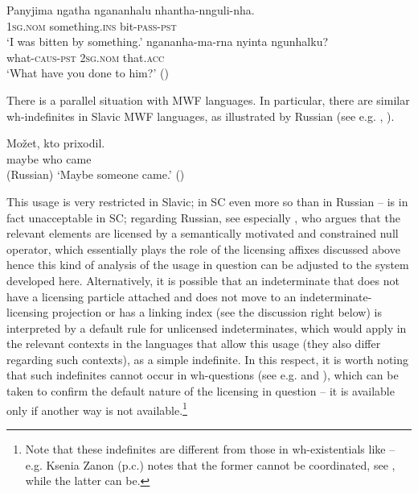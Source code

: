 \documentclass[output=paper,colorlinks,citecolor=brown]{langscibook}
\begin{document}
\ea Panyjima\label{ex:bosk:19}
\ea \label{ex:bosk:19a}
\gll ngatha       ngananhalu            nhantha-nnguli-nha.\\
\textsc{1sg.nom} something.\textsc{ins} bit-\textsc{pass}-\textsc{pst}\\%
\glt `I was bitten by something.'
\ex \label{ex:bosk:19b}
\gll ngananha-ma-rna   nyinta         ngunhalku?\\  what-\textsc{caus}-\textsc{pst}  \textsc{2sg.nom}  that.\textsc{acc}\\
\glt  `What have you done to him?'          \hfill (\citealt{Dench1981})
\z 
\z 

\noindent There is a parallel situation with MWF languages. In particular, there are similar wh-indefinites in Slavic MWF languages, as illustrated by Russian  (see e.g. \citealt{Zanon2022}, \citealt{HengeveldRoelofsen2023}).

 
\ea \label{ex:bosk:20}
\gll Možet, kto   prixodil.\\
maybe who  came  \\\hfill (Russian)
\glt        `Maybe someone came.' \hfill (\citealt{HengeveldRoelofsen2023})                  \z 

\noindent This usage is very restricted in Slavic; in SC even more so than in Russian --  is in fact unacceptable in SC; regarding Russian, see especially \citet{Zanon2022}, who argues that the relevant elements are licensed by a semantically motivated and constrained null operator, which essentially plays the role of the licensing affixes discussed above hence this kind of analysis of the usage in question can be adjusted to the system developed here. Alternatively, it is possible that an indeterminate that does not have a licensing particle attached and does not move to an indeterminate-licensing projection or has a linking index (see the discussion right below) is interpreted by a default rule for unlicensed indeterminates, which would apply in the relevant contexts in the languages that allow this usage (they also differ regarding such contexts), as a simple indefinite. In this respect, it is worth noting that such indefinites cannot occur in wh-questions (see e.g. \citealt{Zanon2022} and \citealt{HengeveldRoelofsen2023}), which can be taken to confirm the default nature of the licensing in question -- it is available only if another way is not available.\footnote{Note that these indefinites are different from those in wh-existentials like  -- e.g. Ksenia Zanon (p.c.) notes that the former cannot be coordinated, see \citet{Zanon2022}, while the latter can be.} 
\end{document}
